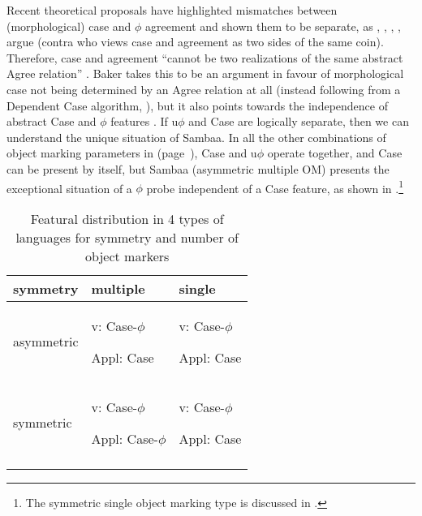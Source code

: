 \documentclass[output=paper
,modfonts
,nonflat]{langsci/langscibook}
\begin{document}
Recent theoretical proposals have highlighted mismatches between (morphological) case and $\phi$ agreement and shown them to be separate, as \citet{Bhatt2005}, \citet{Baker2008b,Baker2008a,Baker2012,Baker2015}, \citet{Bobaljik2008}, \citet{Barany2015}, \citet{StegovecTA} argue (contra \citealt{Chomsky2000, Chomsky2001} who views case and agreement as two sides of the same coin). Therefore, case and agreement “cannot be two realizations of the same abstract Agree relation” \citep[272 on Amharic]{Baker2012}. Baker takes this to be an argument in favour of morphological case not being determined by an Agree relation at all (instead following from a Dependent Case algorithm, \citealt{Marantz1991,Baker2015}), but it also points towards the independence of abstract Case and $\phi$ features \citep{Keine2010, Barany2015}. If u$\phi$ and Case are logically separate, then we can understand the unique situation of Sambaa. In all the other combinations of object marking parameters in  (page~\pageref{tab-vdwal:3}), Case and u$\phi$ operate together, and Case can be present by itself, but Sambaa (asymmetric multiple OM) presents the exceptional situation of a $\phi$ probe independent of a Case feature, as shown in .\footnote{The symmetric single object marking type is discussed in .}\largerpage[1.5]

\begin{table}[bh]
\caption{Featural distribution in 4 types of languages for symmetry and number of object markers} 
\label{tab-vdwal:4}
	\begin{tabularx}{\textwidth}{XXX} 
	\lsptoprule	
		symmetry & multiple & single\\
	\midrule
		asymmetric &  v:       Case-$\phi$ \fbox{+ $\phi$}
		
		Appl: Case & { v:       Case-$\phi$} 
		
		Appl: Case\\ 
	\midrule
		symmetric & { v:       Case-$\phi$} 
		
		Appl: Case-$\phi$ & { v: Case-$\phi$} 
		
		Appl: Case\\
	\lspbottomrule		
	\end{tabularx}
\end{table} 
\end{document}
